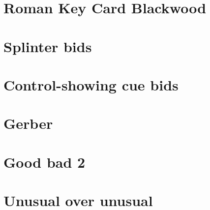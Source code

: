 \section{Roman Key Card Blackwood}

\section{Splinter bids}

\section{Control-showing cue bids}

\section{Gerber}

\section{Good bad 2\bN}

\section{Unusual over unusual}

